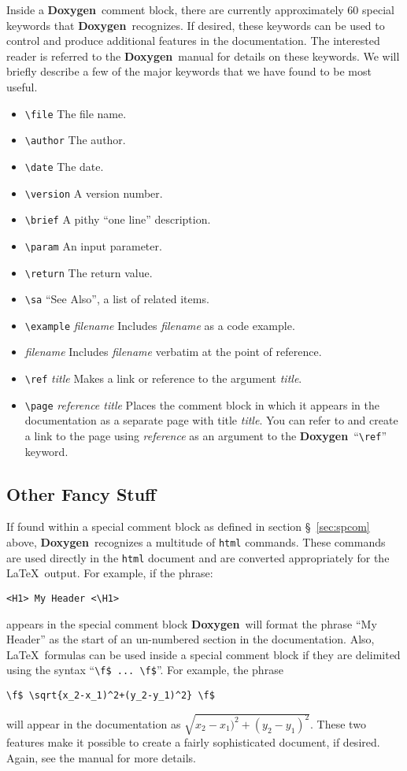 \documentclass[11pt]{nmemo}
\newcommand{\doxy}{{\normalfont\bfseries Doxygen}}
\begin{document}
Inside a \doxy\ comment block, there are currently approximately 60
special keywords that \doxy\ recognizes. If desired, these keywords
can be used to control and produce additional features in the
documentation.  The interested reader is referred to the \doxy\ manual
for details on these keywords.  We will briefly describe a few of the major
keywords that we have found to be most useful.
\begin{itemize}
\item \verb+\file+ The file name.
\item \verb+\author+ The author.
\item \verb+\date+ The date.
\item \verb+\version+ A version number.
\item \verb+\brief+ A pithy ``one line'' description.
\item \verb+\param+ An input parameter.
\item \verb+\return+ The return value.
\item \verb+\sa+ ``See Also'', a list of related items.
\item \verb+\example+ {\em filename} Includes {\em filename} as a code
  example.
\item \verb++ {\em filename} Includes {\em filename} verbatim at the
  point of reference.
\item \verb+\ref+ {\em title} Makes a link or reference 
  to the argument {\em title}.
\item \verb+\page+ {\em reference title} Places the comment block in which
  it appears in the documentation as a separate page with title {\em
    title}. You can refer to and create a link to the page using {\em
    reference} as an argument to the \doxy\ ``\verb+\ref+'' keyword.
\end{itemize}

\subsection{Other Fancy Stuff}

If found within a special comment block 
as defined in section \S~\ref{sec:spcom} above, \doxy\ 
recognizes a multitude of \texttt{html} commands. These
commands are used directly in the \texttt{html} document and are converted appropriately for
the \LaTeX\ output. 
For example, if the phrase: 
\begin{verbatim}
<H1> My Header <\H1>
\end{verbatim} appears in the special comment
block \doxy\ will format the phrase ``My Header'' as the start of an
un-numbered section in the documentation. 
Also, \LaTeX\ formulas can be used inside a special
comment block if they are delimited using the syntax ``\verb+\f$ ... \f$+''.
For example, the phrase 
\begin{verbatim}
\f$ \sqrt{x_2-x_1)^2+(y_2-y_1)^2} \f$ 
\end{verbatim}  will appear in the
documentation as $\sqrt{x_2-x_1)^2+(y_2-y_1)^2}$.
These two
features make it possible to create a fairly sophisticated document, if desired.
Again, see the manual for more details.
\end{document}
